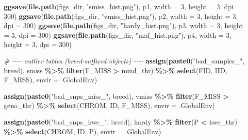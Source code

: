 \documentclass[
]{article}
\newenvironment{Shaded}{\begin{snugshade}}{\end{snugshade}}
\newcommand{\AttributeTok}[1]{\textcolor[rgb]{0.13,0.29,0.53}{#1}}
\newcommand{\CommentTok}[1]{\textcolor[rgb]{0.56,0.35,0.01}{\textit{#1}}}
\newcommand{\DecValTok}[1]{\textcolor[rgb]{0.00,0.00,0.81}{#1}}
\newcommand{\FunctionTok}[1]{\textcolor[rgb]{0.13,0.29,0.53}{\textbf{#1}}}
\newcommand{\NormalTok}[1]{#1}
\newcommand{\SpecialCharTok}[1]{\textcolor[rgb]{0.81,0.36,0.00}{\textbf{#1}}}
\newcommand{\StringTok}[1]{\textcolor[rgb]{0.31,0.60,0.02}{#1}}
\begin{document}
\begin{Shaded}
\begin{Highlighting}[]
  \FunctionTok{ggsave}\NormalTok{(}\FunctionTok{file.path}\NormalTok{(figs\_dir, }\StringTok{"smiss\_hist.png"}\NormalTok{), p1, }\AttributeTok{width =} \DecValTok{3}\NormalTok{, }\AttributeTok{height =} \DecValTok{3}\NormalTok{, }\AttributeTok{dpi =} \DecValTok{300}\NormalTok{)}
  \FunctionTok{ggsave}\NormalTok{(}\FunctionTok{file.path}\NormalTok{(figs\_dir, }\StringTok{"vmiss\_hist.png"}\NormalTok{), p2, }\AttributeTok{width =} \DecValTok{3}\NormalTok{, }\AttributeTok{height =} \DecValTok{3}\NormalTok{, }\AttributeTok{dpi =} \DecValTok{300}\NormalTok{)}
  \FunctionTok{ggsave}\NormalTok{(}\FunctionTok{file.path}\NormalTok{(figs\_dir, }\StringTok{"hardy\_hist.png"}\NormalTok{), p3, }\AttributeTok{width =} \DecValTok{3}\NormalTok{, }\AttributeTok{height =} \DecValTok{3}\NormalTok{, }\AttributeTok{dpi =} \DecValTok{300}\NormalTok{)}
  \FunctionTok{ggsave}\NormalTok{(}\FunctionTok{file.path}\NormalTok{(figs\_dir, }\StringTok{"maf\_hist.png"}\NormalTok{),   p4, }\AttributeTok{width =} \DecValTok{3}\NormalTok{, }\AttributeTok{height =} \DecValTok{3}\NormalTok{, }\AttributeTok{dpi =} \DecValTok{300}\NormalTok{)}
  
  \CommentTok{\# {-}{-}{-}{-} outlier tables (breed{-}suffixed objects) {-}{-}{-}{-}}
  \FunctionTok{assign}\NormalTok{(}\FunctionTok{paste0}\NormalTok{(}\StringTok{"bad\_samples\_"}\NormalTok{,   breed),}
\NormalTok{         smiss }\SpecialCharTok{\%\textgreater{}\%} \FunctionTok{filter}\NormalTok{(F\_MISS }\SpecialCharTok{\textgreater{}}\NormalTok{ mind\_thr) }\SpecialCharTok{\%\textgreater{}\%} \FunctionTok{select}\NormalTok{(FID, IID, F\_MISS),}
         \AttributeTok{envir =}\NormalTok{ .GlobalEnv)}
  
  \FunctionTok{assign}\NormalTok{(}\FunctionTok{paste0}\NormalTok{(}\StringTok{"bad\_snps\_miss\_"}\NormalTok{, breed),}
\NormalTok{         vmiss }\SpecialCharTok{\%\textgreater{}\%} \FunctionTok{filter}\NormalTok{(F\_MISS }\SpecialCharTok{\textgreater{}}\NormalTok{ geno\_thr) }\SpecialCharTok{\%\textgreater{}\%} \FunctionTok{select}\NormalTok{(CHROM, ID, F\_MISS),}
         \AttributeTok{envir =}\NormalTok{ .GlobalEnv)}
  
  \FunctionTok{assign}\NormalTok{(}\FunctionTok{paste0}\NormalTok{(}\StringTok{"bad\_snps\_hwe\_"}\NormalTok{,  breed),}
\NormalTok{         hardy }\SpecialCharTok{\%\textgreater{}\%} \FunctionTok{filter}\NormalTok{(P }\SpecialCharTok{\textless{}}\NormalTok{ hwe\_thr) }\SpecialCharTok{\%\textgreater{}\%} \FunctionTok{select}\NormalTok{(CHROM, ID, P),}
         \AttributeTok{envir =}\NormalTok{ .GlobalEnv)}
  

\end{Highlighting}
\end{Shaded}
\end{document}
